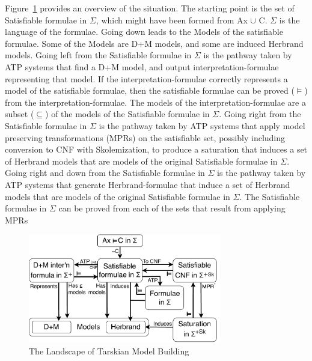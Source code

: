 \documentclass{easychair}
\begin{document}
Figure~\ref{ModelLandscape} provides an overview of the situation.
The starting point is the set of {\sf Satisfiable formulae in $\Sigma$}, which might have been
formed from {\sf Ax $\cup$ {\raisebox{0.4ex}{\texttildelow}}C}. 
$\Sigma$ is the language of the formulae.
Going down leads to the {\sf Models} of the satisfiable formulae.
Some of the {\sf Models} are {\sf D+M} models, and some are induced Herbrand models.
Going left from the {\sf Satisfiable formulae in $\Sigma$} is the pathway taken by ATP systems 
that find a {\sf D+M} model, and output interpretation-formulae representing that model.
If the interpretation-formulae correctly represents a model of the satisfiable formulae, then
the satisfiable formulae can be proved ($\vDash$) from the interpretation-formulae.
The models of the interpretation-formulae are a subset ($\subseteq$) of the models of the
{\sf Satisfiable formulae in $\Sigma$}.
Going right from the {\sf Satisfiable formulae in $\Sigma$} is the pathway taken by ATP systems
that apply model preserving transformations ({\sf MPR}s) on the satisfiable set, possibly 
including conversion to CNF with Skolemization, to produce a saturation that induces a set of 
Herbrand models that are models of the original {\sf Satisfiable formulae in $\Sigma$}.
Going right and down from the {\sf Satisfiable formulae in $\Sigma$} is the pathway taken by ATP 
systems that generate Herbrand-formulae that induce a set of Herbrand models that are models of 
the original {\sf Satisfiable formulae in $\Sigma$}.
The {\sf Satisfiable formulae in $\Sigma$} can be proved from each of the sets that result from 
applying MPRs

\begin{figure}[htbp]
\centering
\includegraphics[width=0.75\textwidth]{ModelLandscape.pdf}
\caption{The Landscape of Tarskian Model Building}
\label{ModelLandscape}
\end{figure}
\end{document}
